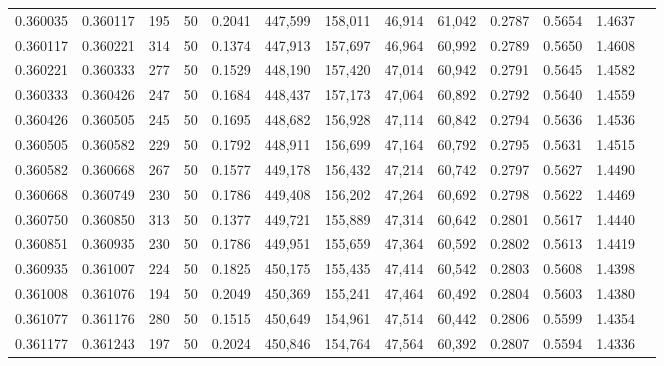 \begin{tabular}{rrrrrrrrrrrrr}
0.360035 & 0.360117 &   195 &  50 &                                     0.2041 & 447,599 & 158,011 &  46,914 &  61,042 & 0.2787 & 0.5654 & 1.4637 \\
0.360117 & 0.360221 &   314 &  50 &                                     0.1374 & 447,913 & 157,697 &  46,964 &  60,992 & 0.2789 & 0.5650 & 1.4608 \\
0.360221 & 0.360333 &   277 &  50 &                                     0.1529 & 448,190 & 157,420 &  47,014 &  60,942 & 0.2791 & 0.5645 & 1.4582 \\
0.360333 & 0.360426 &   247 &  50 &                                     0.1684 & 448,437 & 157,173 &  47,064 &  60,892 & 0.2792 & 0.5640 & 1.4559 \\
0.360426 & 0.360505 &   245 &  50 &                                     0.1695 & 448,682 & 156,928 &  47,114 &  60,842 & 0.2794 & 0.5636 & 1.4536 \\
0.360505 & 0.360582 &   229 &  50 &                                     0.1792 & 448,911 & 156,699 &  47,164 &  60,792 & 0.2795 & 0.5631 & 1.4515 \\
0.360582 & 0.360668 &   267 &  50 &                                     0.1577 & 449,178 & 156,432 &  47,214 &  60,742 & 0.2797 & 0.5627 & 1.4490 \\
0.360668 & 0.360749 &   230 &  50 &                                     0.1786 & 449,408 & 156,202 &  47,264 &  60,692 & 0.2798 & 0.5622 & 1.4469 \\
0.360750 & 0.360850 &   313 &  50 &                                     0.1377 & 449,721 & 155,889 &  47,314 &  60,642 & 0.2801 & 0.5617 & 1.4440 \\
0.360851 & 0.360935 &   230 &  50 &                                     0.1786 & 449,951 & 155,659 &  47,364 &  60,592 & 0.2802 & 0.5613 & 1.4419 \\
0.360935 & 0.361007 &   224 &  50 &                                     0.1825 & 450,175 & 155,435 &  47,414 &  60,542 & 0.2803 & 0.5608 & 1.4398 \\
0.361008 & 0.361076 &   194 &  50 &                                     0.2049 & 450,369 & 155,241 &  47,464 &  60,492 & 0.2804 & 0.5603 & 1.4380 \\
0.361077 & 0.361176 &   280 &  50 &                                     0.1515 & 450,649 & 154,961 &  47,514 &  60,442 & 0.2806 & 0.5599 & 1.4354 \\
0.361177 & 0.361243 &   197 &  50 &                                     0.2024 & 450,846 & 154,764 &  47,564 &  60,392 & 0.2807 & 0.5594 & 1.4336 \\

\end{tabular}

